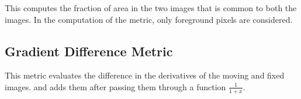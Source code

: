 This computes the fraction of area in the two images that is common to both 
the images. In the computation of the metric, only foreground pixels are considered.

\subsection{Gradient Difference Metric}
This  metric evaluates the 
difference in the derivatives of the moving and fixed images. and adds 
them after passing them through a function $\frac{1}{1+x}$.



